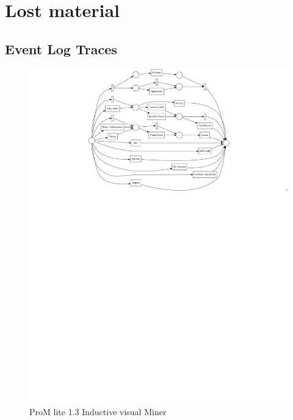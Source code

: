 

\section{Lost material}


\subsection{Event Log Traces}


\begin{figure}[!htb]
        \centering 
    \includegraphics[width =\textwidth, trim =1cm 17cm 0cm 0cm, clip]{resource/problem2.pdf}
    \caption{ProM lite 1.3 Inductive visual Miner}
    \label{figure:eventLogTraces2}

\end{figure}




